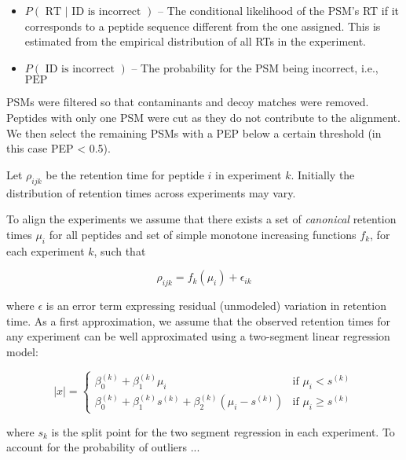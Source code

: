 \begin{spacing}{1.55}
\begin{itemize}
\item $P(\mbox{ RT }|\mbox{ ID is incorrect })$ -- The conditional likelihood of the PSM's RT if it corresponds to a peptide sequence different from the one assigned. This is estimated from the empirical distribution of all RTs in the experiment.

\item $P(\mbox{ ID is incorrect })$ -- The probability for the PSM being incorrect, i.e., $\mbox{PEP}$

\end{itemize}






PSMs were filtered so that contaminants and decoy matches were removed. Peptides with only one PSM were cut as they do not contribute to the alignment. We then select the remaining PSMs with a PEP below a certain threshold (in this case PEP < 0.5).

Let $\rho_{ijk}$ be the retention time for peptide $i$ in experiment $k$.  Initially the distribution of retention times across experiments may vary.

To align the experiments we assume that there exists a set of \emph{canonical} retention times $\mu_i$ for all peptides and set of simple monotone increasing functions $f_k$, for each experiment $k$, such that

$$\rho_{ijk} = f_k(\mu_i) + \epsilon_{ik}$$

where $\epsilon$ is an error term expressing residual (unmodeled) variation in retention time.  As a first approximation, we assume that the observed retention times for any experiment can be well approximated using a two-segment linear regression model: 

\[ \lvert x\rvert = \begin{cases}
	\beta_0^{(k)} + \beta_1^{(k)}\mu_i & \text{if }  \mu_i < s^{(k)}  \\
	\beta_0^{(k)} + \beta_1^{(k)}s^{(k)} + \beta_2^{(k)}(\mu_i - s^{(k)}) & \text{if } \mu_i \ge s^{(k)}
                 \end{cases} \]

where $s_k$ is the split point for the two segment regression in each experiment.  To account for the probability of outliers ...


\end{spacing}
